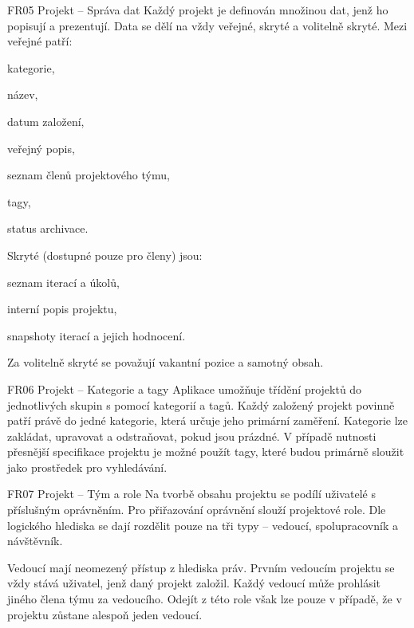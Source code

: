 \begin{dl}
   \item[FR05 Projekt -- Správa dat]
   Každý projekt je definován množinou dat, jenž ho popisují a prezentují. Data se dělí na vždy veřejné, skryté a volitelně skryté. Mezi veřejné patří: 

   \begin{ulnar}
      \item kategorie,
      \item název,
      \item datum založení,
      \item veřejný popis,
      \item seznam členů projektového týmu,
      \item tagy,
      \item status archivace.
   \end{ulnar}


   Skryté (dostupné pouze pro členy) jsou: 

   \begin{ulnar}
      \item seznam iterací a úkolů, 
      \item interní popis projektu, 
      \item snapshoty iterací a jejich hodnocení.
   \end{ulnar}
   

   Za volitelně skryté se považují vakantní pozice a samotný obsah.

   \item[FR06 Projekt -- Kategorie a tagy]
   Aplikace umožňuje třídění projektů do jednotlivých skupin s pomocí kategorií a tagů. Každý založený projekt povinně patří právě do jedné kategorie, která určuje jeho primární zaměření. Kategorie lze zakládat, upravovat a odstraňovat, pokud jsou prázdné. V případě nutnosti přesnější specifikace projektu je možné použít tagy, které budou primárně sloužit jako prostředek pro vyhledávání.

   \item[FR07 Projekt -- Tým a role]
   Na tvorbě obsahu projektu se podílí uživatelé s příslušným oprávněním. Pro přiřazování oprávnění slouží projektové role. Dle logického hlediska se dají rozdělit pouze na tři typy -- vedoucí, spolupracovník a návštěvník.

   \newpage
   Vedoucí mají neomezený přístup z hlediska práv. Prvním vedoucím projektu se vždy stává uživatel, jenž daný projekt založil. Každý vedoucí může prohlásit jiného člena týmu za vedoucího. Odejít z této role však lze pouze v případě, že v projektu zůstane alespoň jeden vedoucí.


\end{dl}
